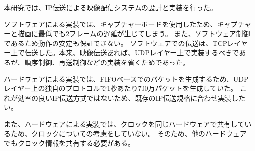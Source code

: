 本研究では、IP伝送による映像配信システムの設計と実装を行った。

ソフトウェアによる実装では、キャプチャーボードを使用したため、キャプチャーと描画に最低でも2フレームの遅延が生じてしまう。
また、ソフトウェア制御であるため動作の安定も保証できない。
ソフトウェアでの伝送は、TCPレイヤー上で伝送した。本来、映像伝送あれば、UDPレイヤー上で実装するべきであるが、順序制御、再送制御などの実装を省くためであった。

ハードウェアによる実装では、FIFOベースでのパケットを生成するため、UDPレイヤー上の独自のプロトコルで1秒あたり700万パケットを生成していた。
これが効率の良いIP伝送方式ではないため、既存のIP伝送規格に合わせ実装したい。

また、ハードウェアによる実装では、クロックを同じハードウェアで共有しているため、クロックについての考慮をしていない。
そのため、他のハードウェアでもクロック情報を共有する必要がある。

